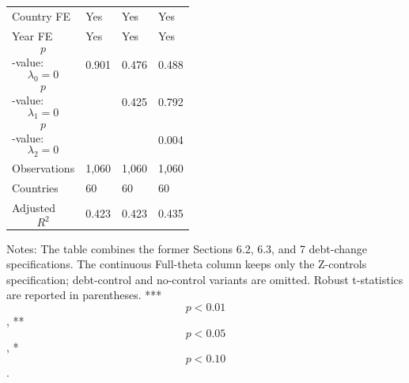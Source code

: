 \begin{table}[H]
\begin{threeparttable}
\begin{tabularx}{\textwidth}{lYYY}
Country FE & Yes & Yes & Yes \\
Year FE & Yes & Yes & Yes \\
$$p$$-value: $$\lambda_0=0$$ & 0.901 & 0.476 & 0.488 \\
$$p$$-value: $$\lambda_1=0$$ &  & 0.425 & 0.792 \\
$$p$$-value: $$\lambda_2=0$$ &  &  & 0.004 \\
Observations & 1,060 & 1,060 & 1,060 \\
Countries & 60 & 60 & 60 \\
Adjusted $$R^2$$ & 0.423 & 0.423 & 0.435 \\
\bottomrule
\end{tabularx}
\begin{tablenotes}[flushleft]\footnotesize
\item Notes: The table combines the former Sections 6.2, 6.3, and 7 debt-change specifications. The continuous Full-theta column keeps only the Z-controls specification; debt-control and no-control variants are omitted. Robust t-statistics are reported in parentheses. *** $$p<0.01$$, ** $$p<0.05$$, * $$p<0.10$$.
\end{tablenotes}
\end{threeparttable}
\end{table}
